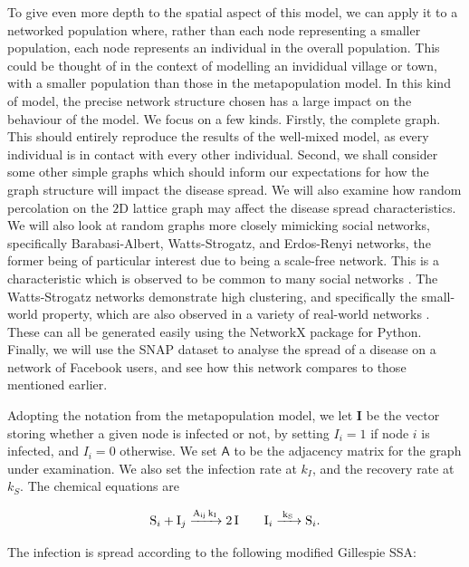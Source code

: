 \documentclass[12pt,a4paper,openany,twoside]{book}
\renewcommand{\v}[1]{\mathbf{#1}}      %
\newcommand{\m}[1]{\bm{\mathsf{#1}}}	 %
\begin{document}
To give even more depth to the spatial aspect of this model, we can apply it to a networked population where, rather than each node representing a smaller population, each node represents an individual in the overall population. This could be thought of in the context of modelling an invididual village or town, with a smaller population than those in the metapopulation model. In this kind of model, the precise network structure chosen has a large impact on the behaviour of the model. We focus on a few kinds. Firstly, the complete graph. This should entirely reproduce the results of the well-mixed model, as every individual is in contact with every other individual. Second, we shall consider some other simple graphs which should inform our expectations for how the graph structure will impact the disease spread. We will also examine how random percolation on the $2$D lattice graph may affect the disease spread characteristics. We will also look at random graphs more closely mimicking social networks, specifically Barabasi-Albert, Watts-Strogatz, and Erdos-Renyi networks, the former being of particular interest due to being a scale-free network. This is a characteristic which is observed to be common to many social networks \citep{McGlohon2011}. The Watts-Strogatz networks demonstrate high clustering, and specifically the small-world property, which are also observed in a variety of real-world networks \citep{McGlohon2011}. These can all be generated easily using the NetworkX package for Python. Finally, we will use the SNAP dataset \citep{snapnets} to analyse the spread of a disease on a network of Facebook users, and see how this network compares to those mentioned earlier.

Adopting the notation from the metapopulation model, we let $\v{I}$ be the vector storing whether a given node is infected or not, by setting $I_i = 1$ if node $i$ is infected, and $I_i = 0$ otherwise. We set $\m{A}$ to be the adjacency matrix for the graph under examination. We also set the infection rate at $k_I$, and the recovery rate at $k_S$. The chemical equations are

\begin{equation}
	\ce{S_i + I_j ->[A_{ij} k_I] 2 I} \qquad \ce{I_i ->[k_S] S_i}.
\end{equation}

The infection is spread according to the following modified Gillespie SSA:
\end{document}
